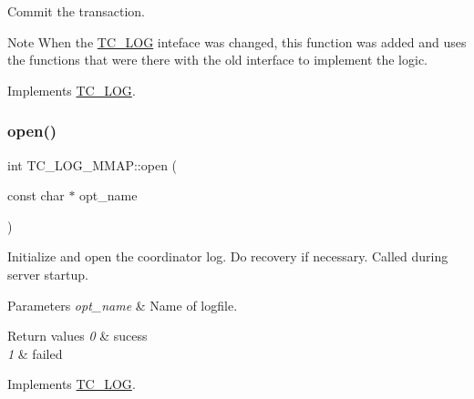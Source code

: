 Commit the transaction.

\begin{DoxyNote}{Note}
When the \mbox{\hyperlink{classTC__LOG}{T\+C\+\_\+\+L\+OG}} inteface was changed, this function was added and uses the functions that were there with the old interface to implement the logic. 
\end{DoxyNote}


Implements \mbox{\hyperlink{classTC__LOG_a3f9ef43db745a798f8b361eb0b93ff22}{T\+C\+\_\+\+L\+OG}}.

\mbox{\label{classTC__LOG__MMAP_a2a7bf09548c80ed522a20ad9b9cff295}} 
\subsubsection{\texorpdfstring{open()}{open()}}
{\footnotesize\ttfamily int T\+C\+\_\+\+L\+O\+G\+\_\+\+M\+M\+A\+P\+::open (\begin{DoxyParamCaption}\item[{const char $\ast$}]{opt\+\_\+name }\end{DoxyParamCaption})\hspace{0.3cm}{\ttfamily [virtual]}}

Initialize and open the coordinator log. Do recovery if necessary. Called during server startup.


\begin{DoxyParams}{Parameters}
{\em opt\+\_\+name} & Name of logfile.\\
\hline
\end{DoxyParams}

\begin{DoxyRetVals}{Return values}
{\em 0} & sucess \\
\hline
{\em 1} & failed \\
\hline
\end{DoxyRetVals}


Implements \mbox{\hyperlink{classTC__LOG_a34eb4c35fe8d29b0febbd700a61b282d}{T\+C\+\_\+\+L\+OG}}.

\mbox{\label{classTC__LOG__MMAP_a334d9853acc2f7b12ae2a3014806f6c4}} 
